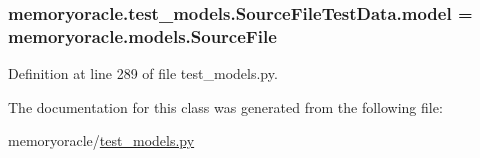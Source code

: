 \hypertarget{classmemoryoracle_1_1test__models_1_1SourceFileTestData_a32df26215837eee4ca7924b8e87d4107}{}
\subsubsection[{model}]{\setlength{\rightskip}{0pt plus 5cm}memoryoracle.\+test\+\_\+models.\+Source\+File\+Test\+Data.\+model = {\bf memoryoracle.\+models.\+Source\+File}\hspace{0.3cm}{\ttfamily [static]}}\label{classmemoryoracle_1_1test__models_1_1SourceFileTestData_a32df26215837eee4ca7924b8e87d4107}


Definition at line 289 of file test\+\_\+models.\+py.



The documentation for this class was generated from the following file\+:\begin{DoxyCompactItemize}
\item 
memoryoracle/\hyperlink{test__models_8py}{test\+\_\+models.\+py}\end{DoxyCompactItemize}
